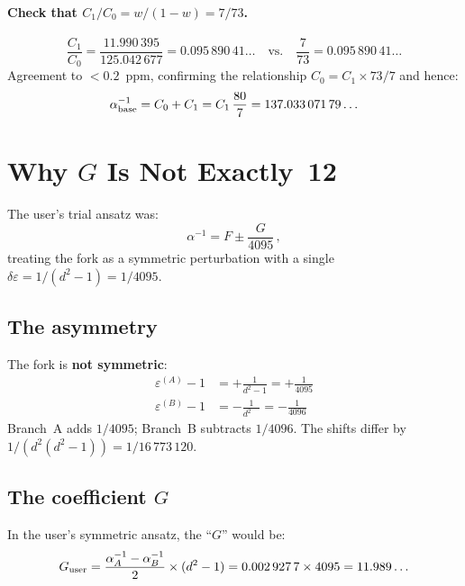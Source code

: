 \documentclass[12pt,a4paper]{article}
\begin{document}
\paragraph{Check that $C_1/C_0 = w/(1-w) = 7/73$.}
\begin{equation}
\frac{C_1}{C_0} = \frac{11.990\,395}{125.042\,677} = 0.095\,890\,41\ldots
\quad\text{vs.}\quad
\frac{7}{73} = 0.095\,890\,41\ldots
\end{equation}
Agreement to $< 0.2$~ppm, confirming the relationship $C_0 = C_1 \times 73/7$
and hence:
\begin{equation}
\alpha^{-1}_{\rm base} = C_0 + C_1
= C_1\,\frac{80}{7}
= 137.033\,071\,79\ldots
\end{equation}

\section{Why $G$ Is Not Exactly~12}
\label{sec:G-not-12}

The user's trial ansatz was:
\begin{equation}
\alpha^{-1} = F \pm \frac{G}{4095}\,,
\end{equation}
treating the fork as a symmetric perturbation with a single
$\delta\varepsilon = 1/(d^2-1) = 1/4095$.

\subsection{The asymmetry}

The fork is \textbf{not symmetric}:
\begin{align}
\varepsilon^{(A)} - 1 &= +\frac{1}{d^2-1} = +\frac{1}{4095} \\
\varepsilon^{(B)} - 1 &= -\frac{1}{d^2\phantom{{}^{-1}}} = -\frac{1}{4096}
\end{align}
Branch~A adds $1/4095$; Branch~B subtracts $1/4096$. The shifts differ by
$1/(d^2(d^2{-}1)) = 1/16\,773\,120$.

\subsection{The coefficient $G$}

In the user's symmetric ansatz, the ``$G$'' would be:
\begin{equation}
G_{\rm user} = \frac{\alpha^{-1}_A - \alpha^{-1}_B}{2}
\times (d^2-1) = 0.002\,927\,7 \times 4095 = 11.989\ldots
\end{equation}
\end{document}
